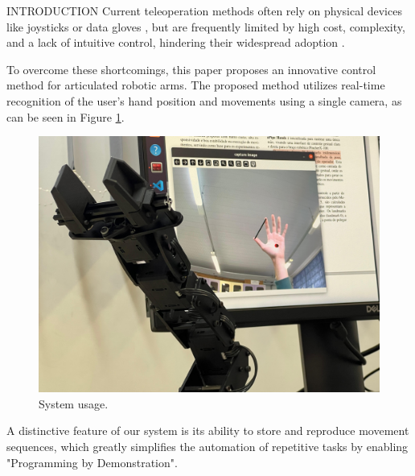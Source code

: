 \documentclass[%
  final,%
  english,%
  english,%
]{beamer}
\begin{document}
\begin{frame}[t, fragile = singleslide]
\begin{columns}[t, onlytextwidth]
%
\begin{column}{0.49\textwidth}
%
\begin{block}{INTRODUCTION}
Current teleoperation methods often rely on physical devices like joysticks or data gloves \cite{zick2024teleoperation,martinelli2020human}, but are frequently limited by high cost, complexity, and a lack of intuitive control, hindering their widespread adoption \cite{moniruzzaman2022teleoperation}.


To overcome these shortcomings, this paper proposes an innovative control method for articulated robotic arms. The proposed method utilizes real-time recognition of the user's hand position and movements using a single camera, as can be seen in Figure \ref{fig:uso_do_sistema}.

\vspace{-0.15cm}
\begin{figure}[!htb]
    \centering
    \includegraphics[scale=0.12]{Figuras/hand_and_robot.jpeg}
    \caption{System usage.}
    \label{fig:uso_do_sistema}
\end{figure}

A distinctive feature of our system is its ability to store and reproduce movement sequences, which greatly simplifies the automation of repetitive tasks by enabling "Programming by Demonstration".

\end{block}
%



\end{column}
\end{columns}
\end{frame}
\end{document}
